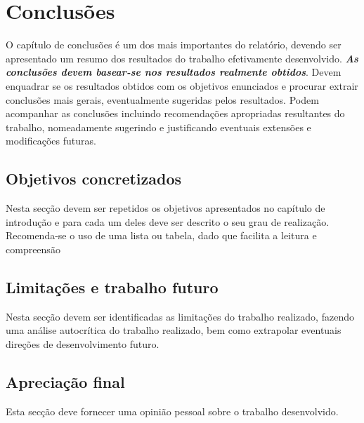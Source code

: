 % 
\chapter{Conclusões} 
\label{chap:Conc} %

O capítulo de conclusões é um dos mais importantes do relatório, devendo ser apresentado um resumo dos resultados do trabalho efetivamente desenvolvido. \textit{\textbf{As conclusões devem basear-se nos resultados realmente obtidos}}. Devem enquadrar se os resultados obtidos com os objetivos enunciados e procurar extrair conclusões mais gerais, eventualmente sugeridas pelos resultados. Podem acompanhar as conclusões incluindo recomendações apropriadas resultantes do trabalho, nomeadamente sugerindo e justificando eventuais extensões e modificações futuras.


\section{Objetivos concretizados} 
\label{sec:desc} %

Nesta secção devem ser repetidos os objetivos apresentados no capítulo de introdução e para cada um deles deve ser descrito o seu grau de realização. Recomenda-se o uso de uma lista ou tabela, dado que facilita a leitura e compreensão

\section{Limitações e trabalho futuro} 

Nesta secção devem ser identificadas as limitações do trabalho realizado, fazendo uma análise autocrítica do trabalho realizado, bem como extrapolar eventuais direções de desenvolvimento futuro.

\section{Apreciação final} 

Esta secção deve fornecer uma opinião pessoal sobre o trabalho desenvolvido.


